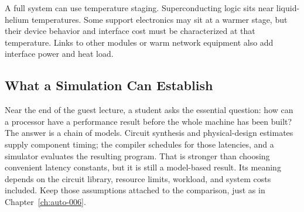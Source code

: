 A full system can use temperature staging.
Superconducting logic sits near liquid-helium temperatures.
Some support electronics may sit at a warmer stage, but their device behavior and interface cost must be characterized at that temperature.
Links to other modules or warm network equipment also add interface power and heat load.

\subsection{What a Simulation Can Establish}\label{subsec:appd-research-evidence}
Near the end of the guest lecture, a student asks the essential question: how can a processor have a performance result before the whole machine has been built?
The answer is a chain of models.
Circuit synthesis and physical-design estimates supply component timing; the compiler schedules for those latencies, and a simulator evaluates the resulting program.
That is stronger than choosing convenient latency constants, but it is still a model-based result.
Its meaning depends on the circuit library, resource limits, workload, and system costs included.
Keep those assumptions attached to the comparison, just as in Chapter~\ref{ch:auto-006}.


